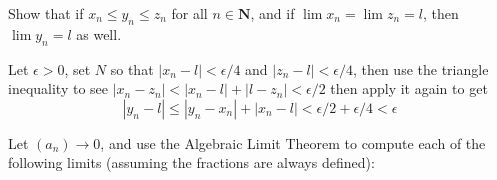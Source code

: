 \begin{exercise}
  Show that if $x_{n} \leq y_{n} \leq z_{n}$ for all $n \in \mathbf{N}$, and if $\lim x_{n}=\lim z_{n}=l$, then $\lim y_{n}=l$ as well.
\end{exercise}

\begin{solution}
  Let $\epsilon > 0$, set $N$ so that $|x_n - l| < \epsilon/4$ and $|z_n - l| < \epsilon/4$, then use the triangle inequality to see $|x_n - z_n| < |x_n-l|+|l-z_n|<\epsilon/2$ then apply it again to get
  $$|y_n - l| \le |y_n - x_n| + |x_n - l| < \epsilon/2 + \epsilon/4 < \epsilon$$
\end{solution}

\begin{exercise}
  Let $\left(a_{n}\right) \rightarrow 0$, and use the Algebraic Limit Theorem to compute each of the following limits (assuming the fractions are always defined):
\end{exercise}

\begin{solution}
\end{solution}


